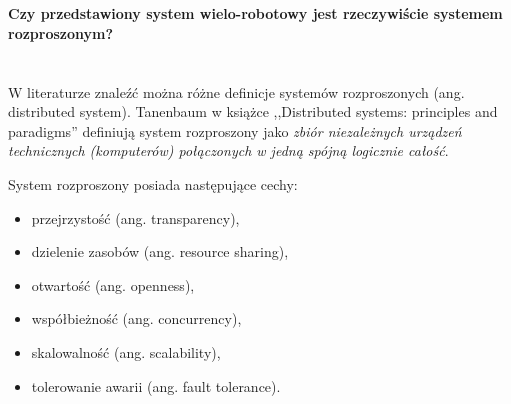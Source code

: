\section*{}
\begin{frame}
\frametitle{\secname}
\begin{center}
	\textbf{Czy przedstawiony  system wielo-robotowy jest rzeczywiście systemem rozproszonym?}
\end{center}
\end{frame}

\section*{}
\begin{frame}
\frametitle{\secname}

W literaturze znaleźć można różne definicje systemów rozproszonych (ang. distributed system). Tanenbaum w książce ,,Distributed systems: principles and paradigms''  definiują system rozproszony jako \textit{zbiór niezależnych urządzeń technicznych (komputerów) połączonych w jedną spójną logicznie całość}.

System rozproszony posiada następujące cechy:
\begin{itemize}
	\item przejrzystość (ang. transparency),
	\item dzielenie zasobów (ang. resource sharing),
	\item otwartość (ang. openness),
	\item współbieżność (ang. concurrency),
	\item skalowalność (ang. scalability),
	\item tolerowanie awarii (ang. fault tolerance).	
\end{itemize}

\end{frame}

